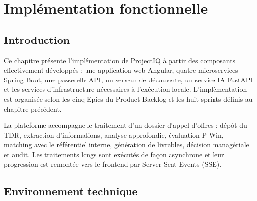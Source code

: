 
\chapter{Implémentation fonctionnelle}
\label{chap:implementation}

\section{Introduction}

Ce chapitre présente l’implémentation de ProjectIQ à partir des composants effectivement développés : une application web Angular, quatre microservices Spring Boot, une passerelle API, un serveur de découverte, un service IA FastAPI et les services d’infrastructure nécessaires à l’exécution locale. L’implémentation est organisée selon les cinq Epics du Product Backlog et les huit sprints définis au chapitre précédent.

La plateforme accompagne le traitement d’un dossier d’appel d’offres : dépôt du TDR, extraction d’informations, analyse approfondie, évaluation P-Win, matching avec le référentiel interne, génération de livrables, décision managériale et audit. Les traitements longs sont exécutés de façon asynchrone et leur progression est remontée vers le frontend par Server-Sent Events (SSE).

\section{Environnement technique}

